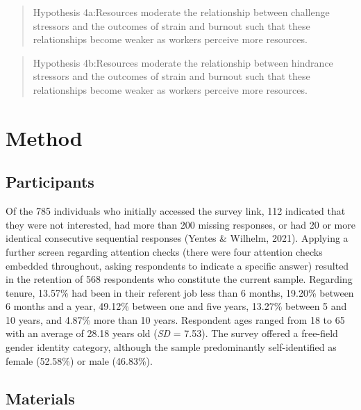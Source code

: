 \documentclass[
  man,mask]{apa7}
\begin{document}
\begin{quote}
Hypothesis 4a:Resources moderate the relationship between challenge stressors and the outcomes of strain and burnout such that these relationships become weaker as workers perceive more resources.
\end{quote}

\begin{quote}
Hypothesis 4b:Resources moderate the relationship between hindrance stressors and the outcomes of strain and burnout such that these relationships become weaker as workers perceive more resources.
\end{quote}

\hypertarget{method}{%
\section{Method}\label{method}}

\hypertarget{participants}{%
\subsection{Participants}\label{participants}}

Of the 785 individuals who initially accessed the survey link, 112 indicated that they were not interested, had more than 200 missing responses, or had 20 or more identical consecutive sequential responses (Yentes \& Wilhelm, 2021). Applying a further screen regarding attention checks (there were four attention checks embedded throughout, asking respondents to indicate a specific answer) resulted in the retention of 568 respondents who constitute the current sample. Regarding tenure, 13.57\% had been in their referent job less than 6 months, 19.20\% between 6 months and a year, 49.12\% between one and five years, 13.27\% between 5 and 10 years, and 4.87\% more than 10 years. Respondent ages ranged from 18 to 65 with an average of 28.18 years old (\emph{SD} = 7.53). The survey offered a free-field gender identity category, although the sample predominantly self-identified as female (52.58\%) or male (46.83\%).

\hypertarget{materials}{%
\subsection{Materials}\label{materials}}
\end{document}
